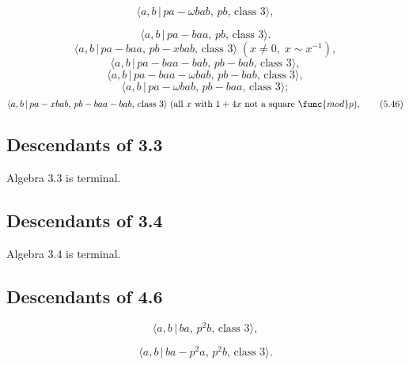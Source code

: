 \documentclass[10pt]{article}
\begin{document}
\begin{equation}
\langle a,b\,|\,pa-\omega bab,\,pb,\,\text{class }3\rangle ,  \tag{5.40}
\end{equation}

\begin{equation}
\langle a,b\,|\,pa-baa,\,pb,\,\text{class }3\rangle .  \tag{5.41}
\end{equation}%
\begin{equation}
\langle a,b\,|\,pa-baa,\,pb-xbab,\,\text{class }3\rangle \;(x\neq 0,\;x\sim
x^{-1}),  \tag{5.42}
\end{equation}
\begin{equation}
\langle a,b\,|\,pa-baa-bab,\,pb-bab,\,\text{class }3\rangle ,  \tag{5.43}
\end{equation}%
\begin{equation}
\langle a,b\,|\,pa-baa-\omega bab,\,pb-bab,\,\text{class }3\rangle , 
\tag{5.44}
\end{equation}%
\begin{equation}
\langle a,b\,|\,pa-\omega bab,\,pb-baa,\,\text{class }3\rangle ;  \tag{5.45}
\end{equation}%
\begin{equation}
\langle a,b\,|\,pa-xbab,\,pb-baa-bab,\,\text{class }3\rangle \;(\text{all }x%
\text{ with }1+4x\text{ not a square }\func{mod}p),  \tag{5.46}
\end{equation}

\subsection{Descendants of 3.3}

Algebra 3.3 is terminal.

\subsection{Descendants of 3.4}

Algebra 3.4 is terminal.

\subsection{Descendants of 4.6}

\begin{equation}
\langle a,b\,|\,ba,\,p^{2}b,\,\text{class }3\rangle ,  \tag{5.47}
\end{equation}

\begin{equation}
\langle a,b\,|\,ba-p^{2}a,\,p^{2}b,\,\text{class }3\rangle .  \tag{5.48}
\end{equation}
\end{document}
